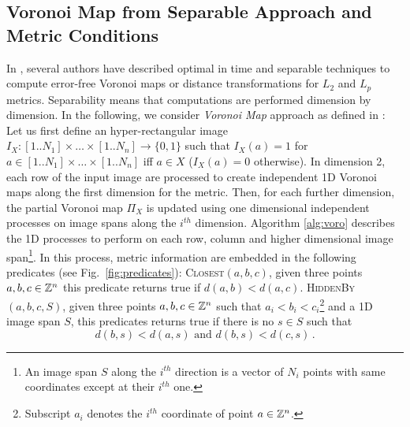 \documentclass{llncs}
\begin{document}
\subsection{Voronoi Map from Separable Approach and Metric Conditions}
\label{sec:voronoi-map-from}
In \cite{Hirata,BreuEtAl95,roerdnik,Maurer2003},
several authors have described optimal in time and separable
techniques to compute error-free Voronoi maps or distance
transformations for $L_2$ and $L_p$ metrics. Separability means that
computations are performed dimension by dimension.
In the following, we consider \emph{Voronoi Map} approach as defined in
\cite{BreuEtAl95}: Let us first define an hyper-rectangular image $I_X:
     [1..N_1]\times\ldots\times[1..N_n] \rightarrow \{0,1\}$ such that
     $I_X(a)= 1$ for $a\in [1..N_1]\times\ldots\times[1..N_n]$ iff
     $a\in X$ ($I_X(a)=0$ otherwise). In dimension 2, each row of the
     input image are processed to create independent 1D Voronoi maps
     along the first dimension for the metric. Then, for each further
     dimension, the partial Voronoi map $\Pi_X$ is updated using one
     dimensional independent processes on image spans along the
     $i^{th}$ dimension.
Algorithm \ref{alg:voro} describes the 1D processes to perform on each
row, column and higher dimensional image span\footnote{An image span
  $S$ along the $i^{th}$ direction is a vector of $N_i$ points with
  same coordinates except at their $i^{th}$ one.}. In this process, metric information
are embedded in the following  predicates (see
Fig.~\ref{fig:predicates}): \textsc{Closest}$(a, b, c)$, given three
points $a,b,c\in{\mathbb{Z}}^n$ this predicate returns true if $d(a,b) <
d(a,c)$. \textsc{HiddenBy}$(a, b, c, S)$, given three points
$a,b,c\in{\mathbb{Z}}^n$ such that $a_i<b_i<c_i$\footnote{Subscript $a_i$ denotes the $i^{th}$ coordinate of point
  $a\in{\mathbb{Z}}^n$.} and a 1D image span
$S$, this
predicates returns true if there is no $s\in S$ such that
    \begin{equation}
      d(b,s) < d(a,s)\text{ and }  d(b,s) < d(c,s)\,.
    \end{equation}
\end{document}
